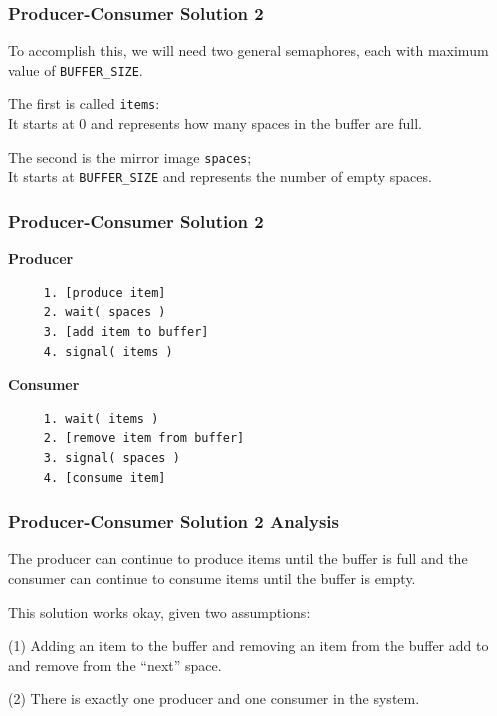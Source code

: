 \begin{frame}
\frametitle{Producer-Consumer Solution 2}

To accomplish this, we will need two general semaphores, each with maximum value of \texttt{BUFFER\_SIZE}. 

The first is called \texttt{items}:\\
\quad It starts at 0 and represents how many spaces in the buffer are full. 

The second is the mirror image \texttt{spaces};\\
\quad It starts at \texttt{BUFFER\_SIZE} and represents the number of empty spaces.


\end{frame}



\begin{frame}[fragile]
\frametitle{Producer-Consumer Solution 2}

\begin{multicols}{2}
\textbf{Producer}
  \begin{verbatim}
	 1. [produce item]
	 2. wait( spaces )
	 3. [add item to buffer]
	 4. signal( items )
  \end{verbatim}
\columnbreak
\textbf{Consumer}
  \begin{verbatim}
	 1. wait( items )
	 2. [remove item from buffer]
	 3. signal( spaces )
	 4. [consume item]
  \end{verbatim}
\end{multicols}
\vspace{-2em}

\end{frame}


\begin{frame}
\frametitle{Producer-Consumer Solution 2 Analysis}

The producer can continue to produce items until the buffer is full and the consumer can continue to consume items until the buffer is empty. 

This solution works okay, given two assumptions:

(1) Adding an item to the buffer and removing an item from the buffer add to and remove from the ``next'' space.


(2) There is exactly one producer and one consumer in the system. 

\end{frame}




